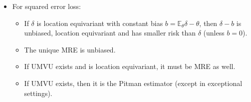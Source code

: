 \documentclass[twoside]{article}
\newcommand\bbE{\mathbb{E}}
\newcommand\dlt{\delta}
\def\t{\theta}
\begin{document}
\begin{itemize}
\item For squared error loss:
\begin{itemize}
\item If $\dlt$ is location equivariant with constant bias $b = \bbE_\t \dlt - \t$, then $\dlt - b$ is unbiased, location equivariant and has smaller risk than $\dlt$ (unless $b = 0$).
\item The unique MRE is unbiased.
\item If UMVU exists and is location equivariant, it must be MRE as well.
\item If UMVU exists, then it is the Pitman estimator (except in exceptional settings).
\end{itemize}

\end{itemize}

\end{document}
